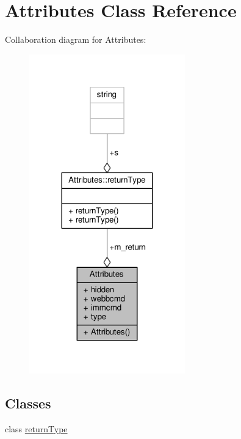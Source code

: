 \hypertarget{classAttributes}{}\section{Attributes Class Reference}
\label{classAttributes}


Collaboration diagram for Attributes\+:
\nopagebreak
\begin{figure}[H]
\begin{center}
\leavevmode
\includegraphics[width=191pt]{d9/d5f/classAttributes__coll__graph}
\end{center}
\end{figure}
\subsection*{Classes}
\begin{DoxyCompactItemize}
\item 
class \hyperlink{classAttributes_1_1returnType}{return\+Type}
\end{DoxyCompactItemize}
